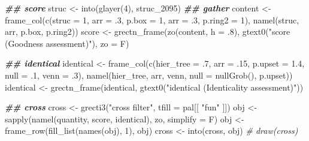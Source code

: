 \documentclass[
]{article}
\newenvironment{Shaded}{\begin{snugshade}}{\end{snugshade}}
\newcommand{\AttributeTok}[1]{\textcolor[rgb]{0.77,0.63,0.00}{#1}}
\newcommand{\CommentTok}[1]{\textcolor[rgb]{0.56,0.35,0.01}{\textit{#1}}}
\newcommand{\DecValTok}[1]{\textcolor[rgb]{0.00,0.00,0.81}{#1}}
\newcommand{\DocumentationTok}[1]{\textcolor[rgb]{0.56,0.35,0.01}{\textbf{\textit{#1}}}}
\newcommand{\FloatTok}[1]{\textcolor[rgb]{0.00,0.00,0.81}{#1}}
\newcommand{\FunctionTok}[1]{\textcolor[rgb]{0.00,0.00,0.00}{#1}}
\newcommand{\NormalTok}[1]{#1}
\newcommand{\OtherTok}[1]{\textcolor[rgb]{0.56,0.35,0.01}{#1}}
\newcommand{\StringTok}[1]{\textcolor[rgb]{0.31,0.60,0.02}{#1}}
\begin{document}
\begin{Shaded}
\begin{Highlighting}[]
\DocumentationTok{\#\# score}
\NormalTok{struc }\OtherTok{\textless{}{-}} \FunctionTok{into}\NormalTok{(}\FunctionTok{glayer}\NormalTok{(}\DecValTok{4}\NormalTok{), struc\_2095)}
\DocumentationTok{\#\# gather}
\NormalTok{content }\OtherTok{\textless{}{-}} \FunctionTok{frame\_col}\NormalTok{(}\FunctionTok{c}\NormalTok{(}\AttributeTok{struc =} \DecValTok{1}\NormalTok{, }\AttributeTok{arr =}\NormalTok{ .}\DecValTok{3}\NormalTok{, }\AttributeTok{p.box =} \DecValTok{1}\NormalTok{, }\AttributeTok{arr =}\NormalTok{ .}\DecValTok{3}\NormalTok{, }\AttributeTok{p.ring2 =} \DecValTok{1}\NormalTok{),}
                     \FunctionTok{namel}\NormalTok{(struc, arr, p.box, p.ring2))}
\NormalTok{score }\OtherTok{\textless{}{-}} \FunctionTok{grectn\_frame}\NormalTok{(}\FunctionTok{zo}\NormalTok{(content, }\AttributeTok{h =}\NormalTok{ .}\DecValTok{8}\NormalTok{), }\FunctionTok{gtext0}\NormalTok{(}\StringTok{"score  (Goodness assessment)"}\NormalTok{), }\AttributeTok{zo =}\NormalTok{ F)}

\DocumentationTok{\#\# identical}
\NormalTok{identical }\OtherTok{\textless{}{-}} \FunctionTok{frame\_col}\NormalTok{(}\FunctionTok{c}\NormalTok{(}\AttributeTok{hier\_tree =}\NormalTok{ .}\DecValTok{7}\NormalTok{, }\AttributeTok{arr =}\NormalTok{ .}\DecValTok{15}\NormalTok{, }\AttributeTok{p.upset =} \FloatTok{1.4}\NormalTok{, }\AttributeTok{null =}\NormalTok{ .}\DecValTok{1}\NormalTok{, }\AttributeTok{venn =}\NormalTok{ .}\DecValTok{3}\NormalTok{),}
                       \FunctionTok{namel}\NormalTok{(hier\_tree, arr, venn, }\AttributeTok{null =} \FunctionTok{nullGrob}\NormalTok{(), p.upset))}
\NormalTok{identical }\OtherTok{\textless{}{-}} \FunctionTok{grectn\_frame}\NormalTok{(identical, }\FunctionTok{gtext0}\NormalTok{(}\StringTok{"identical  (Identicality assessment)"}\NormalTok{))}

\DocumentationTok{\#\# cross}
\NormalTok{cross }\OtherTok{\textless{}{-}} \FunctionTok{grecti3}\NormalTok{(}\StringTok{"cross filter"}\NormalTok{, }\AttributeTok{tfill =}\NormalTok{ pal[[ }\StringTok{"fun"}\NormalTok{ ]])}
\NormalTok{obj }\OtherTok{\textless{}{-}} \FunctionTok{sapply}\NormalTok{(}\FunctionTok{namel}\NormalTok{(quantity, score, identical), zo, }\AttributeTok{simplify =}\NormalTok{ F)}
\NormalTok{obj }\OtherTok{\textless{}{-}} \FunctionTok{frame\_row}\NormalTok{(}\FunctionTok{fill\_list}\NormalTok{(}\FunctionTok{names}\NormalTok{(obj), }\DecValTok{1}\NormalTok{), obj)}
\NormalTok{cross }\OtherTok{\textless{}{-}} \FunctionTok{into}\NormalTok{(cross, obj)}
\CommentTok{\# draw(cross)}
\end{Highlighting}
\end{Shaded}
\end{document}
